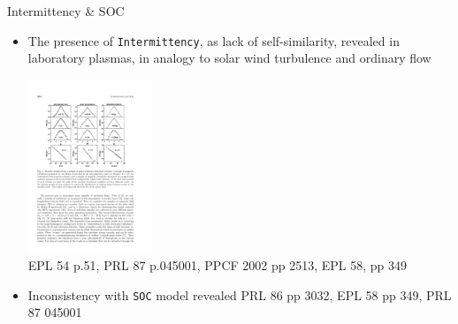 \documentclass[t,10pt]{beamer}
\begin{document}
\begin{frame}{Intermittency \& SOC}
\begin{itemize}[<+->]
\item The presence of
  \textcolor{ta3chameleon}{\texttt{Intermittency}}, as lack of
  self-similarity, revealed in laboratory plasmas, in analogy to solar
  wind turbulence and ordinary flow

\begin{center}
\includegraphics[height=5.2cm]{global-intermittency} \\
{\tiny EPL 54 p.51, PRL 87 p.045001, PPCF 2002 pp 2513, EPL 58, pp 349 }
\end{center}

\item Inconsistency with
  \textcolor{ta3chameleon}{\texttt{SOC}} model revealed
{\tiny PRL 86 pp 3032, EPL 58 pp 349, PRL 87 045001 }
\end{itemize}
\end{frame}
\end{document}

